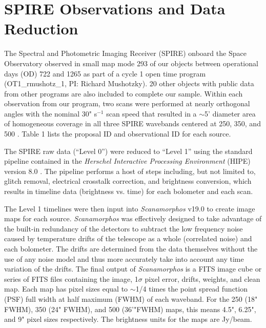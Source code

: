 \section{\herschel{} SPIRE Observations and Data Reduction}\label{obs}
The Spectral and Photometric Imaging Receiver (SPIRE) \citep{Griffin:2010sf} onboard the \herschel{} Space Observatory \citep{Pilbratt:2010rz} observed in small map mode 293 of our objects between operational days (OD) 722 and 1265 as part of a cycle 1 open time program (OT1\_rmushotz\_1, PI: Richard Mushotzky). 20 other objects with public data from other programs are also included to complete our sample. Within each observation from our program, two scans were performed at nearly orthogonal angles with the nominal 30" s$^{-1}$ scan speed that resulted in a $\sim$5' diameter area of homogeneous coverage in all three SPIRE wavebands centered at 250, 350, and 500 \um. Table 1 lists the proposal ID and observational ID for each source.

The SPIRE raw data (``Level 0'') were reduced to ``Level 1'' using the standard pipeline contained in the \textit{Herschel Interactive Processing Environment} (HIPE) version 8.0 \citep{Ott:2010rm}. The pipeline performs a host of steps including, but not limited to, glitch removal, electrical crosstalk correction, and brightness conversion, which results in timeline data (brightness vs. time) for each bolometer and each scan. 

The Level 1 timelines were then input into \textit{Scanamorphos} v19.0 \citep{Roussel:2013gf} to create image maps for each source. \textit{Scanamorphos} was effectively designed to take advantage of the built-in redundancy of the detectors to subtract the low frequency noise caused by temperature drifts of the telescope as a whole (correlated noise) and each bolometer. The drifts are determined from the data themselves without the use of any noise model and thus more accurately take into account any time variation of the drifts. The final output of \textit{Scanamorphos} is a FITS image cube or series of FITS files containing the image, 1$\sigma$ pixel error, drifts, weights, and clean map. Each map has pixel sizes equal to $ \sim$1/4 times the point spread function (PSF) full width at half maximum (FWHM) of each waveband. For the 250 (18" FWHM), 350 (24" FWHM), and 500 \micron{} (36'"FWHM) maps, this means 4.5", 6.25", and 9" pixel sizes respectively. The brightness units for the maps are Jy/beam.